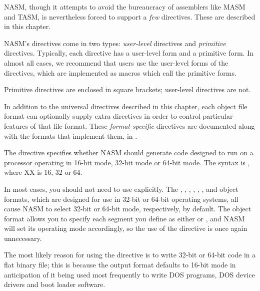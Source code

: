 
NASM, though it attempts to avoid the bureaucracy of assemblers like
MASM and TASM, is nevertheless forced to support a \emph{few}
directives. These are described in this chapter.

NASM's directives come in two types: 
\emph{user-level} directives and 
\emph{primitive} directives. Typically, each directive has a
user-level form and a primitive form. In almost all cases, we
recommend that users use the user-level forms of the directives,
which are implemented as macros which call the primitive forms.

Primitive directives are enclosed in square brackets; user-level
directives are not.

In addition to the universal directives described in this chapter,
each object file format can optionally supply extra directives in
order to control particular features of that file format. These
\emph{format-specific} directives are
documented along with the formats that implement them, in
.


The  directive specifies whether NASM should generate code
designed to run on a processor
operating in 16-bit mode, 32-bit mode or 64-bit mode. The syntax is
, where XX is 16, 32 or 64.

In most cases, you should not need to use  explicitly. The
, , , , ,
,  and  object formats, which
are designed for use in 32-bit or 64-bit operating systems, all cause
NASM to select 32-bit or 64-bit mode, respectively, by default.
The  object format allows you to specify each segment
you define as either  or , and NASM will
set its operating mode accordingly, so the use of the 
directive is once again unnecessary.

The most likely reason for using the  directive is to write
32-bit or 64-bit code in a flat binary file; this is because the 
output format defaults to 16-bit mode in anticipation of it being
used most frequently to write DOS  programs, DOS 
device drivers and boot loader software.

